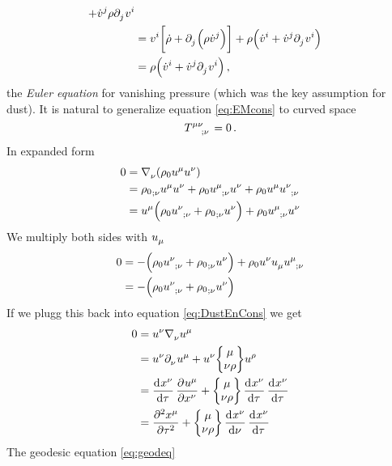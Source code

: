\begin{example}[Dust]
\begin{equation}
\begin{split}
+\tensor{\dot{v}}{^j}\rho\tensor{\partial}{_j}\tensor{v}{^i}\\
&=\tensor{v}{^i}\left[\dot{\rho}+\tensor{\partial}{_j}\left(\rho\tensor{\dot{v}}{^j}\right)\right]
+\rho\left(\tensor{\dot{v}}{^i}+\tensor{\dot{v}}{^j}\tensor{\partial}{_j}\tensor{v}{^i}\right)\\
&=\rho\left(\tensor{\dot{v}}{^i}+\tensor{\dot{v}}{^j}\tensor{\partial}{_j}\tensor{v}{^i}\right)\,,
\end{split}
\end{equation}
the \emph{Euler equation} for vanishing pressure (which was the key assumption
for dust). It is natural to generalize equation \eqref{eq:EMcons} to curved
space
\begin{equation}
\tensor{T}{^\mu^\nu_{;\nu}}=0\,.
\end{equation}
In expanded form
\begin{equation}
\begin{split}
0
&=\tensor{\nabla}{_\nu}\left(\rho_0\tensor{u}{^\mu}\tensor{u}{^\nu}\right)\\
&=\tensor{{\rho_0}}{_{;\nu}}\tensor{u}{^\mu}\tensor{u}{^\nu}
+\rho_0\tensor{u}{^\mu_{;\nu}}\tensor{u}{^\nu}
+\rho_0\tensor{u}{^\mu}\tensor{u}{^\nu_{;\nu}}\\
&=\tensor{u}{^\mu}\left(\rho_0\tensor{u}{^\nu_{;\nu}}+\tensor{{\rho_0}}{_{;\nu}}\tensor{u}{^\nu}\right)
+\rho_0\tensor{u}{^\mu_{;\nu}}\tensor{u}{^\nu} \label{eq:DustEnCons}
\end{split}
\end{equation}
We multiply both sides with $\tensor{u}{_\mu}$
\begin{equation}
\begin{split}
0
&=-\left(\rho_0\tensor{u}{^\nu_{;\nu}}+\tensor{{\rho_0}}{_{;\nu}}\tensor{u}{^\nu}\right)
+\rho_0\tensor{u}{^\nu}\tensor{u}{_\mu}\tensor{u}{^\mu_{;\nu}}\\
&=-\left(\rho_0\tensor{u}{^\nu_{;\nu}}
+\tensor{{\rho_0}}{_{;\nu}}\tensor{u}{^\nu}\right)
\end{split}
\end{equation}
If we plugg this back into equation \eqref{eq:DustEnCons} we get
\begin{equation}
\begin{split}
0&=\tensor{u}{^\nu}\tensor{\nabla}{_\nu}\tensor{u}{^\mu}\\
&=\tensor{u}{^\nu}\tensor{\partial}{_\nu}\tensor{u}{^\mu}
+\tensor{u}{^\nu}\cSym{\mu}{\nu}{\rho}\tensor{u}{^\rho}\\
&=\dod{\tensor{x}{^\nu}}{\tau}\dpd{\tensor{u}{^\mu}}{\tensor{x}{^\nu}}
+\cSym{\mu}{\nu}{\rho}\dod{\tensor{x}{^\nu}}{\tau}\dod{\tensor{x}{^\nu}}{\tau}\\
&=\dpd[2]{\tensor{x}{^\mu}}{\tau}
+\cSym{\mu}{\nu}{\rho}\dod{\tensor{x}{^\nu}}{\nu}\dod{\tensor{x}{^\nu}}{\tau}\\
\end{split}
\end{equation}
The geodesic equation \eqref{eq:geodeq}
\end{example}
